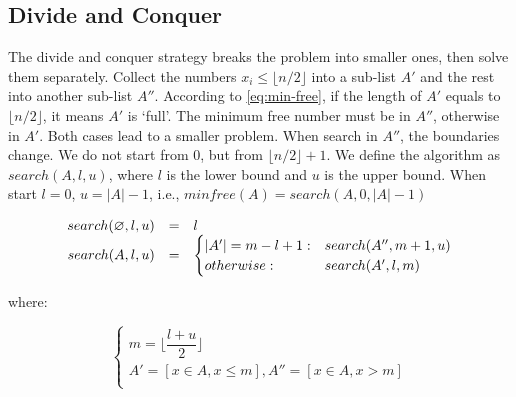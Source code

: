 \documentclass[b5paper]{article}
\begin{document}





\subsection*{Divide and Conquer}
The divide and conquer strategy breaks the problem into smaller ones, then solve them separately. Collect the numbers $x_i \leq \lfloor n/2 \rfloor$ into a sub-list $A'$ and the rest into another sub-list $A''$. According to \cref{eq:min-free}, if the length of $A'$ equals to $\lfloor n/2 \rfloor$, it means $A'$ is `full'. The minimum free number must be in $A''$, otherwise in $A'$. Both cases lead to a smaller problem. When search in $A''$, the boundaries change. We do not start from $0$, but from $\lfloor n/2 \rfloor + 1$. We define the algorithm as $search(A, l, u)$, where $l$ is the lower bound and $u$ is the upper bound. When start $l = 0$, $u = |A| - 1$, i.e., $minfree(A) = search(A, 0, |A|-1)$

\[
\begin{array}{rcl}
search(\varnothing, l, u) & = & l \\
search(A, l, u) & = & \begin{cases}
       |A'| = m - l + 1 : & search(A'', m+1, u) \\
       otherwise : & search(A',  l, m) \\
\end{cases}
\end{array}
\]

where:

\[
\begin{cases}
m = \lfloor \dfrac{l + u}{2} \rfloor \\
A' = [x \in A, x \leq m ], A'' = [x \in A, x > m ] \\
\end{cases}
\]
\end{document}
